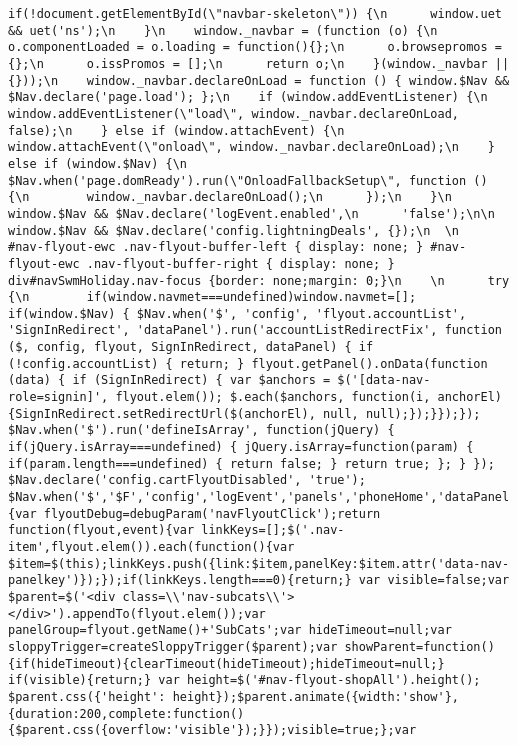 \documentclass[
]{article}
\begin{document}
\begin{verbatim}
if(!document.getElementById(\"navbar-skeleton\")) {\n      window.uet && uet('ns');\n    }\n    window._navbar = (function (o) {\n      o.componentLoaded = o.loading = function(){};\n      o.browsepromos = {};\n      o.issPromos = [];\n      return o;\n    }(window._navbar || {}));\n    window._navbar.declareOnLoad = function () { window.$Nav && $Nav.declare('page.load'); };\n    if (window.addEventListener) {\n      window.addEventListener(\"load\", window._navbar.declareOnLoad, false);\n    } else if (window.attachEvent) {\n      window.attachEvent(\"onload\", window._navbar.declareOnLoad);\n    } else if (window.$Nav) {\n      $Nav.when('page.domReady').run(\"OnloadFallbackSetup\", function () {\n        window._navbar.declareOnLoad();\n      });\n    }\n    window.$Nav && $Nav.declare('logEvent.enabled',\n      'false');\n\n    window.$Nav && $Nav.declare('config.lightningDeals', {});\n  \n       #nav-flyout-ewc .nav-flyout-buffer-left { display: none; } #nav-flyout-ewc .nav-flyout-buffer-right { display: none; } div#navSwmHoliday.nav-focus {border: none;margin: 0;}\n    \n      try {\n        if(window.navmet===undefined)window.navmet=[]; if(window.$Nav) { $Nav.when('$', 'config', 'flyout.accountList', 'SignInRedirect', 'dataPanel').run('accountListRedirectFix', function ($, config, flyout, SignInRedirect, dataPanel) { if (!config.accountList) { return; } flyout.getPanel().onData(function (data) { if (SignInRedirect) { var $anchors = $('[data-nav-role=signin]', flyout.elem()); $.each($anchors, function(i, anchorEl) {SignInRedirect.setRedirectUrl($(anchorEl), null, null);});}});}); $Nav.when('$').run('defineIsArray', function(jQuery) { if(jQuery.isArray===undefined) { jQuery.isArray=function(param) { if(param.length===undefined) { return false; } return true; }; } }); $Nav.declare('config.cartFlyoutDisabled', 'true'); $Nav.when('$','$F','config','logEvent','panels','phoneHome','dataPanel','flyouts.renderPromo','flyouts.sloppyTrigger','flyouts.accessibility','util.mouseOut','util.onKey','debug.param').build('flyouts.buildSubPanels',function($,$F,config,logEvent,panels,phoneHome,dataPanel,renderPromo,createSloppyTrigger,a11yHandler,mouseOutUtility,onKey,debugParam){var flyoutDebug=debugParam('navFlyoutClick');return function(flyout,event){var linkKeys=[];$('.nav-item',flyout.elem()).each(function(){var $item=$(this);linkKeys.push({link:$item,panelKey:$item.attr('data-nav-panelkey')});});if(linkKeys.length===0){return;} var visible=false;var $parent=$('<div class=\\'nav-subcats\\'></div>').appendTo(flyout.elem());var panelGroup=flyout.getName()+'SubCats';var hideTimeout=null;var sloppyTrigger=createSloppyTrigger($parent);var showParent=function(){if(hideTimeout){clearTimeout(hideTimeout);hideTimeout=null;} if(visible){return;} var height=$('#nav-flyout-shopAll').height(); $parent.css({'height': height});$parent.animate({width:'show'},{duration:200,complete:function(){$parent.css({overflow:'visible'});}});visible=true;};var 
\end{verbatim}
\end{document}
